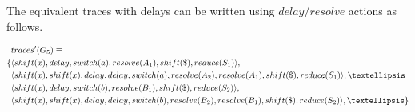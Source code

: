 \documentclass[a4paper,11pt]{article}
\begin{document}
The equivalent traces with delays can be written using $delay$/$resolve$ actions as follows.

{\small\parbox{.3\textwidth}{\begin{align*}
&traces^{\prime}(G_5) \equiv \\
\{ & \langle shift(x), delay, switch(a), resolve(A_1), shift(\$), reduce(S_1) \rangle,\\
   & \langle shift(x), shift(x), delay, delay, switch(a), resolve(A_2), resolve(A_1), shift(\$), reduce(S_1) \rangle, \textellipsis \\
   & \langle shift(x), delay, switch(b), resolve(B_1), shift(\$), reduce(S_2) \rangle,\\
   & \langle shift(x), shift(x), delay, delay, switch(b), resolve(B_2), resolve(B_1), shift(\$), reduce(S_2) \rangle, \textellipsis \}
\end{align*}}}
\end{document}
